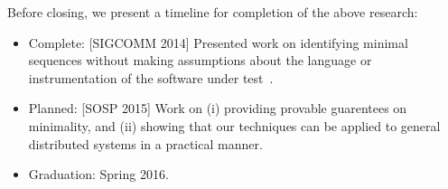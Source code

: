 Before closing, we present a timeline for completion of the above research:

\begin{itemize}
\item Complete: [SIGCOMM 2014] Presented work on identifying minimal sequences without making assumptions about the
language or instrumentation of the software under test~\cite{sts2014}.
\item Planned: [SOSP 2015] Work on (i) providing provable guarentees on minimality, and (ii) showing
that our techniques can be applied to general distributed systems in a
practical manner.
\item Graduation: Spring 2016.
\end{itemize}
